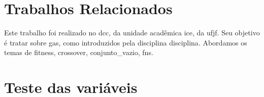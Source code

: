 \section{Trabalhos Relacionados}%
\label{sec:relacionados}


Este trabalho foi realizado no \gls{dcc}, da unidade acadêmica \gls{ice}, da \gls{ufjf}.
Seu objetivo é tratar sobre \glspl{ga}, como introduzidos pela disciplina \gls{disciplina}.
Abordamos os temas de \gls{fitness}, \gls{crossover}, \gls{conjunto_vazio}, \glspl{fn}.

\section{Teste das variáveis}%
\label{sec:teste_variaveis}

\testaVariaveis{}
